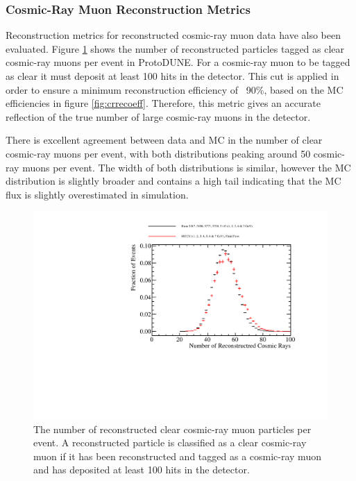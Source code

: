 \subsubsection{Cosmic-Ray Muon Reconstruction Metrics}

Reconstruction metrics for reconstructed cosmic-ray muon data have also been evaluated.  Figure \ref{fig:ncrdata} shows the number of reconstructed particles tagged as clear cosmic-ray muons per event in ProtoDUNE.  For a cosmic-ray muon to be tagged as clear it must deposit at least 100 hits in the detector.  This cut is applied in order to ensure a minimum reconstruction efficiency of ~90\%, based on the MC efficiencies in figure \ref{fig:crrecoeff}.  Therefore, this metric gives an accurate reflection of the true number of large cosmic-ray muons in the detector.  

There is excellent agreement between data and MC in the number of clear cosmic-ray muons per event, with both distributions peaking around 50 cosmic-ray muons per event.  The width of both distributions is similar, however the MC distribution is slightly broader and contains a high tail indicating that the MC flux is slightly overestimated in simulation.  

\begin{figure}
\includegraphics[width=1.0\textwidth]{Figures/Metrics/Data/Cosmics/NumberofReconstructedCosmicRays.pdf}
\caption{The number of reconstructed clear cosmic-ray muon particles per event.  A reconstructed particle is classified as a clear cosmic-ray muon if it has been reconstructed and tagged as a cosmic-ray muon and has deposited at least 100 hits in the detector.}
\label{fig:ncrdata}
\end{figure}


